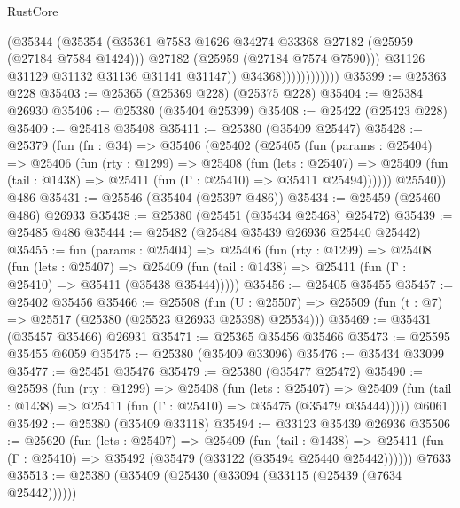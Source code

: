 \begin{lexlean}{RustCore}
\begin{coremodule}
                              (@35344
                                (@35354
                                  (@35361
                                    @7583
                                    @1626
                                    @34274
                                    @33368
                                    @27182
                                    (@25959 (@27184 @7584 @1424)))
                                  @27182
                                  (@25959 (@27184 @7574 @7590)))
                                @31126
                                @31129
                                @31132
                                @31136
                                @31141
                                @31147))
                            @34368))))))))))))
@35399 := @25363 @228
@35403 := @25365 (@25369 @228) (@25375 @228)
@35404 := @25384 @26930
@35406 := @25380 (@35404 @25399)
@35408 := @25422 (@25423 @228)
@35409 := @25418 @35408
@35411 := @25380 (@35409 @25447)
@35428 := @25379
    (fun (fn : @34) =>
    @35406
      (@25402
        (@25405
          (fun (params : @25404) =>
          @25406
            (fun (rty : @1299) =>
            @25408
              (fun (lets : @25407) =>
              @25409 (fun (tail : @1438) => @25411 (fun (Γ : @25410) => @35411 @25494))))))
        @25540))
    @486
@35431 := @25546 (@35404 (@25397 @486))
@35434 := @25459 (@25460 @486) @26933
@35438 := @25380 (@25451 (@35434 @25468) @25472)
@35439 := @25485 @486
@35444 := @25482 (@25484 @35439 @26936 @25440 @25442)
@35455 := fun (params : @25404) =>
  @25406
    (fun (rty : @1299) =>
    @25408
      (fun (lets : @25407) =>
      @25409 (fun (tail : @1438) => @25411 (fun (Γ : @25410) => @35411 (@35438 @35444)))))
@35456 := @25405 @35455
@35457 := @25402 @35456
@35466 := @25508
    (fun (U : @25507) => @25509 (fun (t : @7) => @25517 (@25380 (@25523 @26933 @25398) @25534)))
@35469 := @35431 (@35457 @35466) @26931
@35471 := @25365 @35456 @35466
@35473 := @25595 @35455 @6059
@35475 := @25380 (@35409 @33096)
@35476 := @35434 @33099
@35477 := @25451 @35476
@35479 := @25380 (@35477 @25472)
@35490 := @25598
    (fun (rty : @1299) =>
    @25408
      (fun (lets : @25407) =>
      @25409 (fun (tail : @1438) => @25411 (fun (Γ : @25410) => @35475 (@35479 @35444)))))
    @6061
@35492 := @25380 (@35409 @33118)
@35494 := @33123 @35439 @26936
@35506 := @25620
    (fun (lets : @25407) =>
    @25409
      (fun (tail : @1438) =>
      @25411 (fun (Γ : @25410) => @35492 (@35479 (@33122 (@35494 @25440 @25442))))))
    @7633
@35513 := @25380 (@35409 (@25430 (@33094 (@33115 (@25439 (@7634 @25442))))))

\end{coremodule}
\end{lexlean}
